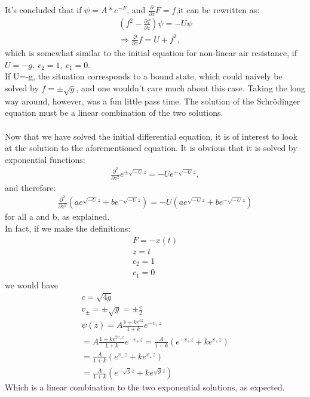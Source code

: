 \documentclass[english,a4paper,oneside,article,9pt]{memoir}
\begin{document}
It's concluded that if $\psi=A*e^{-F}$, and $\frac{\partial}{\partial z}F=f$,it can be rewritten as:
\begin{align*}
(f^2-\frac{\partial f}{\partial z})\psi=-U\psi\\
\Rightarrow \frac{\partial}{\partial z}f=U+f^2,
\end{align*}
which is somewhat similar to the initial equation for non-linear air resistance, if $U=-g,\ c_2=1,\ c_1=0$.\\
If U=-g, the situation corresponds to a bound state, which could naively be solved by $f=\pm\sqrt{g}$, and one wouldn't care much about this case. Taking the long way around, however, was a fun little pass time. The solution of the Schrödinger equation must be a linear combination of the two solutions.\\
\\
Now that we have solved the initial differential equation, it is of interest to look at the solution to the aforementioned equation. It is obvious that it is solved by exponential functions:
\begin{align*}
\frac{\partial^2}{\partial z^2}e^{\pm\sqrt{-U}z}=-Ue^{\pm\sqrt{-U}z},
\end{align*}
and therefore:
\begin{align*}
\frac{\partial^2}{\partial z^2}(ae^{\sqrt{-U}z}+be^{-\sqrt{-U}z})=-U(ae^{\sqrt{-U}z}+be^{-\sqrt{-U}z})
\end{align*}
for all a and b, as explained.
\\
In fact, if we make the definitions:
\begin{align*}
F=-x(t)\\
z=t\\
c_2=1\\
c_1=0
\end{align*}
we would have
\begin{align*}
c=\sqrt{4g}\\
v_\pm=\pm\sqrt{g}=\pm\frac{c}{2}\\
\psi(z)=A\frac{1+ke^{cz}}{1+k}e^{-v_+z}\\
=A\frac{1+ke^{2v_+z}}{1+k}e^{-v_+z}=\frac{A}{1+k}(e^{-v_+z}+ke^{v_+z})\\
=\frac{A}{1+k}(e^{v_-z}+ke^{v_+z})\\
=\frac{A}{1+k}(e^{-\sqrt{g}z}+ke^{\sqrt{g}z})
\end{align*}
Which is a linear combination to the two exponential solutions, as expected.
\end{document}
